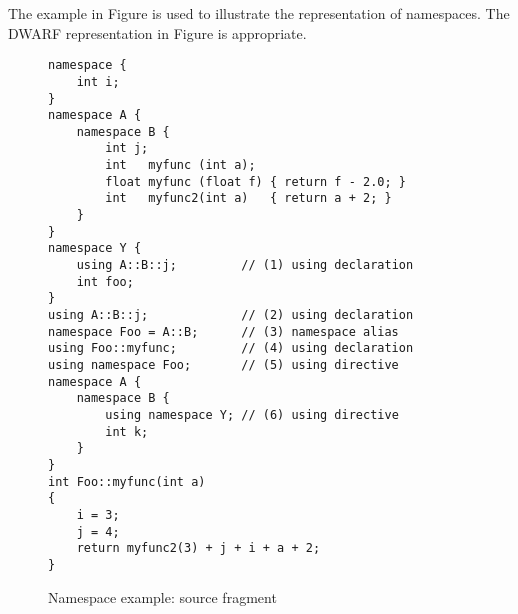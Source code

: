 The  example in 
Figure 
is used 
to illustrate the representation of namespaces.
The DWARF representation in 
Figure 
is appropriate.

\begin{figure}[p]
\begin{lstlisting}
namespace {
    int i;
}
namespace A {
    namespace B {
        int j;
        int   myfunc (int a);
        float myfunc (float f) { return f - 2.0; }
        int   myfunc2(int a)   { return a + 2; }
    }
}
namespace Y {
    using A::B::j;         // (1) using declaration
    int foo;
}
using A::B::j;             // (2) using declaration
namespace Foo = A::B;      // (3) namespace alias
using Foo::myfunc;         // (4) using declaration
using namespace Foo;       // (5) using directive
namespace A {
    namespace B {
        using namespace Y; // (6) using directive
        int k;
    }
}
int Foo::myfunc(int a)
{
    i = 3;
    j = 4;
    return myfunc2(3) + j + i + a + 2;
}
\end{lstlisting}
\caption{Namespace example: source fragment}
\label{fig:namespaceexamplesourcefragment}
\end{figure}


